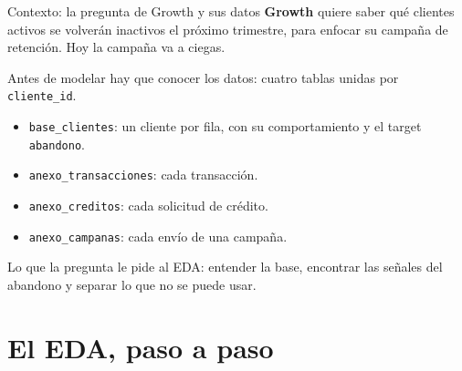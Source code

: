 \documentclass{beamer}
\begin{document}
\begin{frame}{Contexto: la pregunta de Growth y sus datos}
\small
\textbf{Growth} quiere saber qué clientes activos se volverán inactivos el próximo trimestre, para enfocar su campaña de retención. Hoy la campaña va a ciegas.

\vspace{0.15cm}
Antes de modelar hay que conocer los datos: cuatro tablas unidas por \texttt{cliente\_id}.
\begin{itemize} \setlength{\itemsep}{0.06cm}
  \item \texttt{base\_clientes}: un cliente por fila, con su comportamiento y el target \texttt{abandono}.
  \item \texttt{anexo\_transacciones}: cada transacción.
  \item \texttt{anexo\_creditos}: cada solicitud de crédito.
  \item \texttt{anexo\_campanas}: cada envío de una campaña.
\end{itemize}

\vspace{0.15cm}
Lo que la pregunta le pide al EDA: entender la base, encontrar las señales del abandono y separar lo que no se puede usar.
\end{frame}

\section{El EDA, paso a paso}
\end{document}
